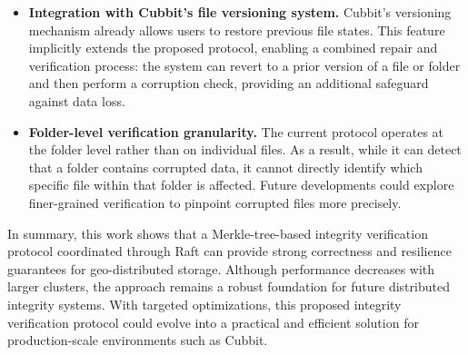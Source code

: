 \begin{itemize}
	\item \textbf{Integration with Cubbit's file versioning system.}
	      Cubbit's versioning mechanism already allows users to restore previous file states.
	      This feature implicitly extends the proposed protocol, enabling a combined
	      repair and verification process: the system can revert to a prior version of a file or folder and then perform a corruption check, providing an additional safeguard against data loss.

	\item \textbf{Folder-level verification granularity.}
	      The current protocol operates at the folder level rather than on individual files.
	      As a result, while it can detect that a folder contains corrupted data, it cannot directly identify which specific file within that folder is affected.
	      Future developments could explore finer-grained verification to pinpoint corrupted files more precisely.
\end{itemize}

In summary, this work shows that a Merkle-tree-based integrity verification
protocol coordinated through Raft can provide strong correctness and resilience guarantees for geo-distributed storage.
Although performance decreases with larger clusters, the approach remains a robust foundation for future distributed integrity systems.
With targeted optimizations, this proposed integrity verification protocol could evolve into a practical and efficient solution for production-scale environments such as Cubbit.
